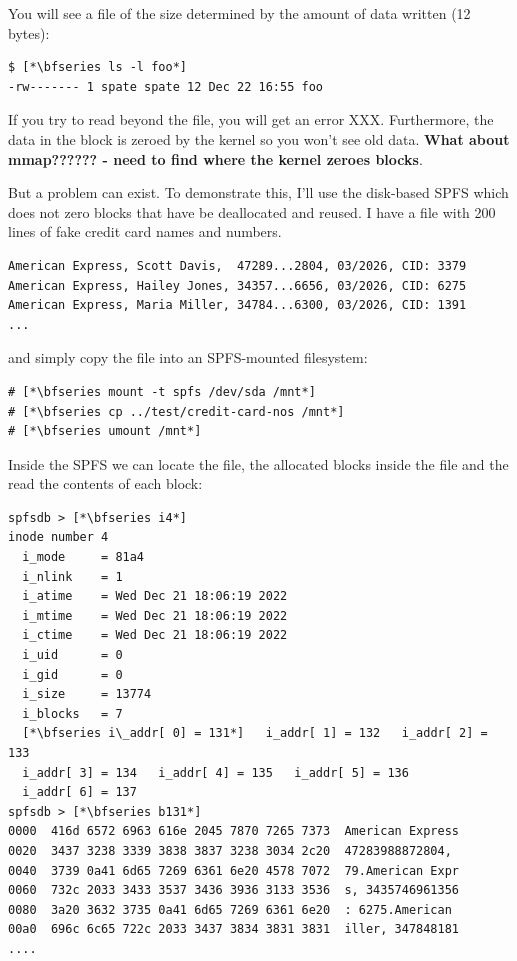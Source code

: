 \noindent
You will see a file of the size determined by the amount of data written (12 bytes):

\begin{lstlisting}
$ [*\bfseries ls -l foo*]
-rw------- 1 spate spate 12 Dec 22 16:55 foo
\end{lstlisting}

\noindent
If you try to read beyond the file, you will get an error XXX. Furthermore, the data in the block is zeroed by the kernel so you won't see old data. \textbf{What about mmap?????? - need to find where the kernel zeroes blocks}. 

But a problem can exist. To demonstrate this, I'll use the disk-based SPFS which does not zero blocks that have be deallocated and reused. I have a file with 200 lines of fake credit card names and numbers. 

\begin{lstlisting}
American Express, Scott Davis,  47289...2804, 03/2026, CID: 3379
American Express, Hailey Jones, 34357...6656, 03/2026, CID: 6275
American Express, Maria Miller, 34784...6300, 03/2026, CID: 1391
...
\end{lstlisting}

\noindent
and simply copy the file into an SPFS-mounted filesystem:

\begin{lstlisting}
# [*\bfseries mount -t spfs /dev/sda /mnt*]
# [*\bfseries cp ../test/credit-card-nos /mnt*]
# [*\bfseries umount /mnt*]
\end{lstlisting}

\noindent
Inside the SPFS  we can locate the file, the allocated blocks inside the file and the read the contents of each block:

\begin{lstlisting}
spfsdb > [*\bfseries i4*]
inode number 4
  i_mode     = 81a4
  i_nlink    = 1
  i_atime    = Wed Dec 21 18:06:19 2022
  i_mtime    = Wed Dec 21 18:06:19 2022
  i_ctime    = Wed Dec 21 18:06:19 2022
  i_uid      = 0
  i_gid      = 0
  i_size     = 13774
  i_blocks   = 7
  [*\bfseries i\_addr[ 0] = 131*]   i_addr[ 1] = 132   i_addr[ 2] = 133 
  i_addr[ 3] = 134   i_addr[ 4] = 135   i_addr[ 5] = 136 
  i_addr[ 6] = 137 
spfsdb > [*\bfseries b131*]
0000  416d 6572 6963 616e 2045 7870 7265 7373  American Express
0020  3437 3238 3339 3838 3837 3238 3034 2c20  47283988872804, 
0040  3739 0a41 6d65 7269 6361 6e20 4578 7072  79.American Expr
0060  732c 2033 3433 3537 3436 3936 3133 3536  s, 3435746961356
0080  3a20 3632 3735 0a41 6d65 7269 6361 6e20  : 6275.American 
00a0  696c 6c65 722c 2033 3437 3834 3831 3831  iller, 347848181
....
\end{lstlisting}

